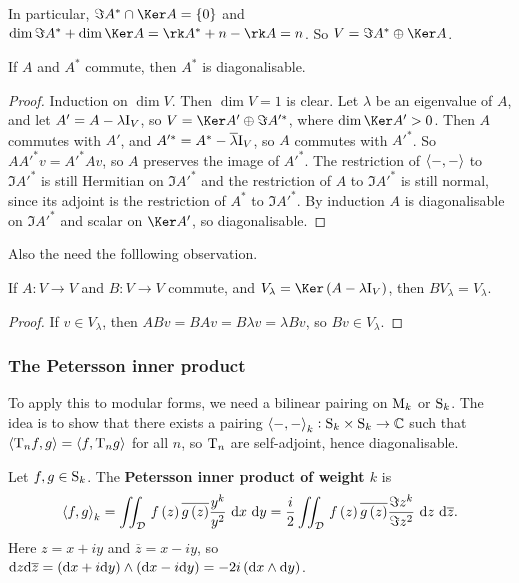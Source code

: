 In particular, $ \Im A^* \cap \Ker A = \cbr{0} $ and $ \dim \Im A^* + \dim \Ker A = \rk A^* + n - \rk A = n $. So $ V = \Im A^* \oplus \Ker A $.

\begin{theorem}
If $ A $ and $ A^* $ commute, then $ A^* $ is diagonalisable.
\end{theorem}

\begin{proof}
Induction on $ \dim V $. Then $ \dim V = 1 $ is clear. Let $ \lambda $ be an eigenvalue of $ A $, and let $ A' = A - \lambda\I_V $, so $ V = \Ker A' \oplus \Im A'^* $, where $ \dim \Ker A' > 0 $. Then $ A $ commutes with $ A' $, and $ A'^* = A^* - \overline{\lambda} \I_V $, so $ A $ commutes with $ A'^* $. So $ AA'^*v = A'^*Av $, so $ A $ preserves the image of $ A'^* $. The restriction of $ \abr{-, -} $ to $ \Im A'^* $ is still Hermitian on $ \Im A'^* $ and the restriction of $ A $ to $ \Im A'^* $ is still normal, since its adjoint is the restriction of $ A^* $ to $ \Im A'^* $. By induction $ A $ is diagonalisable on $ \Im A'^* $ and scalar on $ \Ker A' $, so diagonalisable.
\end{proof}

Also the need the folllowing observation.

\begin{proposition}
If $ A : V \to V $ and $ B : V \to V $ commute, and $ V_\lambda = \Ker \br{A - \lambda\I_V} $, then $ BV_\lambda = V_\lambda $.
\end{proposition}

\begin{proof}
If $ v \in V_\lambda $, then $ ABv = BAv = B\lambda v = \lambda Bv $, so $ Bv \in V_\lambda $.
\end{proof}

\subsubsection{The Petersson inner product}

To apply this to modular forms, we need a bilinear pairing on $ \M_k $ or $ \S_k $. The idea is to show that there exists a pairing $ \abr{-, -}_k : \S_k \times \S_k \to \CC $ such that $ \abr{\T_nf, g} = \abr{f, \T_ng} $ for all $ n $, so $ \T_n $ are self-adjoint, hence diagonalisable.

\begin{definition}
Let $ f, g \in \S_k $. The \textbf{Petersson inner product of weight $ k $} is
$$ \abr{f, g}_k = \iintd{\DDD}{f\br{z}\overline{g\br{z}}\dfrac{y^k}{y^2}}{x}{y} = \dfrac{i}{2}\iintd{\DDD}{f\br{z}\overline{g\br{z}}\dfrac{\Im z^k}{\Im z^2}}{z}{\overline{z}}. $$
Here $ z = x + iy $ and $ \overline{z} = x - iy $, so $ \d z\d\overline{z} = \br{\d x + i\d y} \wedge \br{\d x - i\d y} = -2i\br{\d x \wedge \d y} $.
\end{definition}

